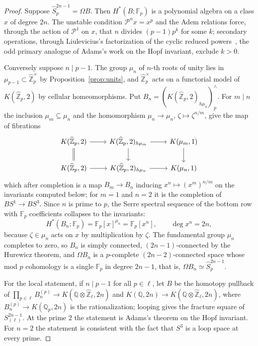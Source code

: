 \documentclass[11pt]{amsart}
\theoremstyle{plain}
\theoremstyle{definition}
\numberwithin{equation}{section}
\newcommand{\Q}{\mathbb{Q}}
\newcommand{\F}{\mathbb{F}}
\newcommand{\Zhat}{\widehat{\mathbb{Z}}}
\newcommand{\units}{^{\times}}
\begin{document}
\begin{proof}
Suppose $\widehat S^{2n-1}_p=\Omega B$.
Then $H^*(B;\F_p)$ is a polynomial algebra on a class $x$ of degree $2n$.
The unstable condition $\mathcal P^nx=x^p$ and the Adem relations force, through the action of $\mathcal P^1$ on $x$, that $n$ divides $(p-1)p^k$ for some $k$; secondary operations, through Liulevicius's factorization of the cyclic reduced powers~\cite{Liulevicius}, the odd primary analogue of Adams's work on the Hopf invariant, exclude $k>0$.

Conversely suppose $n\mid p-1$.
The group $\mu_n$ of $n$-th roots of unity lies in $\mu_{p-1}\subset\Zhat_p\units$ by Proposition~\ref{prop:units}, and $\Zhat_p\units$ acts on a functorial model of $K(\Zhat_p,2)$ by cellular homeomorphisms.
Put $B_n=(K(\Zhat_p,2)_{h\mu_n})^\wedge_p$.
For $m\mid n$ the inclusion $\mu_m\subseteq\mu_n$ and the homomorphism $\mu_n\to\mu_n$, $\zeta\mapsto\zeta^{n/m}$, give the map of fibrations
\[
\begin{tikzcd}
K(\Zhat_p,2)\arrow[r]\arrow[d,equal] & K(\Zhat_p,2)_{h\mu_m}\arrow[r]\arrow[d] & K(\mu_m,1)\arrow[d]\\
K(\Zhat_p,2)\arrow[r] & K(\Zhat_p,2)_{h\mu_n}\arrow[r] & K(\mu_n,1)
\end{tikzcd}
\]
which after completion is a map $B_m\to B_n$ inducing $x^n\mapsto(x^m)^{n/m}$ on the invariants computed below; for $m=1$ and $n=2$ it is the completion of $BS^1\to BS^3$.
Since $n$ is prime to $p$, the Serre spectral sequence of the bottom row with $\F_p$ coefficients collapses to the invariants:
\[
H^*(B_n;\F_p)=\F_p[x]^{\mu_n}=\F_p[x^n],\qquad\deg x^n=2n,
\]
because $\zeta\in\mu_n$ acts on $x$ by multiplication by $\zeta$.
The fundamental group $\mu_n$ completes to zero, so $B_n$ is simply connected, $(2n-1)$-connected by the Hurewicz theorem, and $\Omega B_n$ is a $p$-complete $(2n-2)$-connected space whose mod $p$ cohomology is a single $\F_p$ in degree $2n-1$, that is, $\Omega B_n\simeq\widehat S^{2n-1}_p$.

For the local statement, if $n\mid p-1$ for all $p\in\ell$, let $B$ be the homotopy pullback of $\prod_{p\in\ell}B^{(p)}_n\to K(\Q\otimes\Zhat_\ell,2n)$ and $K(\Q,2n)\to K(\Q\otimes\Zhat_\ell,2n)$, where $B^{(p)}_n\to K(\Q_p,2n)$ is the rationalization; looping gives the fracture square of $S^{2n-1}_{(\ell)}$.
At the prime $2$ the statement is Adams's theorem on the Hopf invariant.
For $n=2$ the statement is consistent with the fact that $S^3$ is a loop space at every prime.
\end{proof}
\end{document}

